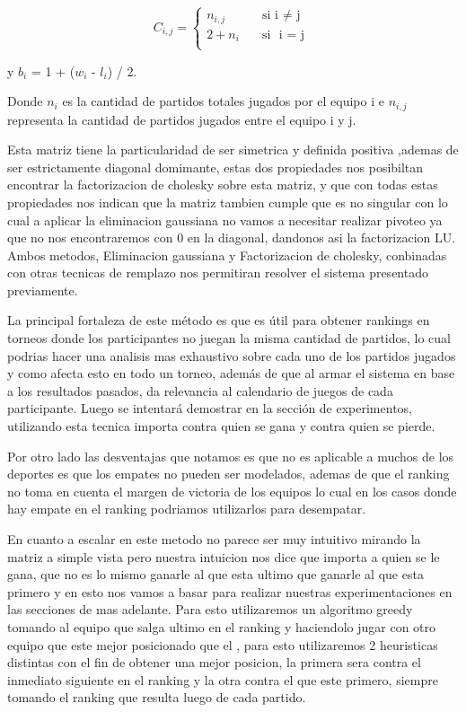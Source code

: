 \[ C_{i,j} =
    \begin{cases}
        n_{i,j}       & \quad \text{si }  \text{i $\neq$ j}\\
        2+n_i & \quad \text{si } \text{ i = j }\\
    \end{cases}

    \]
                    
y $b_i$ = 1 +  ($w_i$ - $l_i$) / 2.

Donde $n_i$ es la cantidad de partidos totales jugados por el equipo i e $n_{i,j}$ representa la cantidad de partidos jugados entre el equipo i y j.

Esta matriz tiene la particularidad de ser simetrica y definida positiva ,ademas de ser estrictamente diagonal domimante, estas dos propiedades nos 
posibiltan encontrar la factorizacion de cholesky sobre esta matriz, y que con todas estas propiedades nos indican que la matriz tambien cumple que es no singular 
con lo cual a aplicar la eliminacion gaussiana no vamos a necesitar realizar pivoteo ya que no nos encontraremos con 0 en la diagonal, dandonos asi la factorizacion LU.
Ambos metodos, Eliminacion gaussiana y Factorizacion de cholesky, conbinadas con otras tecnicas de remplazo nos permitiran resolver el sistema presentado previamente.

La principal fortaleza de este método es que es útil para obtener rankings en torneos donde los participantes no juegan la misma cantidad de partidos, lo cual 
podrias hacer una analisis mas exhaustivo sobre cada uno de los partidos jugados y como afecta esto en todo un torneo,
además de que al armar el sistema en base a los resultados pasados, da relevancia al calendario de juegos de cada participante. 
Luego se intentará demostrar en la sección de experimentos, utilizando esta tecnica importa contra quien se gana y contra quien se pierde.

Por otro lado las desventajas que notamos es que no es aplicable a muchos de los deportes es que los empates no pueden ser modelados, ademas de que el ranking no toma en cuenta
el margen de victoria de los equipos lo cual en los casos donde hay empate en el ranking podriamos utilizarlos para desempatar.

En cuanto a escalar en este metodo no parece ser muy intuitivo mirando la matriz a simple vista pero nuestra intuicion nos dice que importa a quien se le gana, que no es lo mismo ganarle al que esta ultimo que ganarle al que esta primero
y en esto nos vamos a basar para realizar nuestras experimentaciones en las secciones de mas adelante.
Para esto utilizaremos un algoritmo greedy tomando al equipo que salga ultimo en el ranking y haciendolo jugar con otro equipo que este mejor posicionado que el , para esto utilizaremos 2 heuristicas distintas
con el fin de obtener una mejor posicion, la primera sera contra el inmediato siguiente en el ranking y la otra contra el que este primero, siempre tomando el ranking que resulta luego de cada partido.

